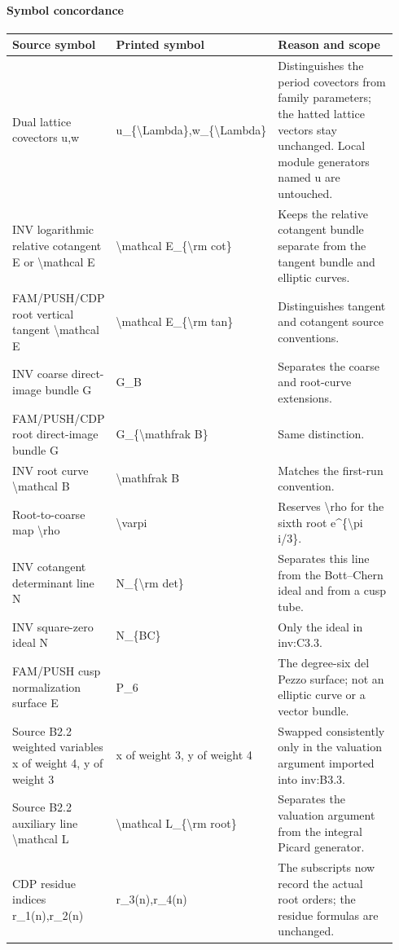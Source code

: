 \paragraph{Symbol concordance}
\begingroup\small\setlength{\tabcolsep}{3pt}\begin{longtable}{@{}L{0.24\linewidth}L{0.25\linewidth}L{0.45\linewidth}@{}}\toprule
Source symbol & Printed symbol & Reason and scope\\\midrule\endhead
Dual lattice covectors u,w & u\_\allowbreak{}\{\textbackslash{}Lambda\},w\_\allowbreak{}\{\textbackslash{}Lambda\} & Distinguishes the period covectors from family parameters; the hatted lattice vectors stay unchanged. Local module generators named u are untouched.\\
INV logarithmic relative cotangent E or \textbackslash{}mathcal E & \textbackslash{}mathcal E\_\allowbreak{}\{\textbackslash{}rm cot\} & Keeps the relative cotangent bundle separate from the tangent bundle and elliptic curves.\\
FAM/\allowbreak{}PUSH/\allowbreak{}CDP root vertical tangent \textbackslash{}mathcal E & \textbackslash{}mathcal E\_\allowbreak{}\{\textbackslash{}rm tan\} & Distinguishes tangent and cotangent source conventions.\\
INV coarse direct-image bundle G & G\_\allowbreak{}B & Separates the coarse and root-curve extensions.\\
FAM/\allowbreak{}PUSH/\allowbreak{}CDP root direct-image bundle G & G\_\allowbreak{}\{\textbackslash{}mathfrak B\} & Same distinction.\\
INV root curve \textbackslash{}mathcal B & \textbackslash{}mathfrak B & Matches the first-run convention.\\
Root-to-coarse map \textbackslash{}rho & \textbackslash{}varpi & Reserves \textbackslash{}rho for the sixth root e\textasciicircum{}\{\textbackslash{}pi i/\allowbreak{}3\}.\\
INV cotangent determinant line N & N\_\allowbreak{}\{\textbackslash{}rm det\} & Separates this line from the Bott--Chern ideal and from a cusp tube.\\
INV square-zero ideal N & N\_\allowbreak{}\{BC\} & Only the ideal in inv:\allowbreak{}C3.3.\\
FAM/\allowbreak{}PUSH cusp normalization surface E & P\_\allowbreak{}6 & The degree-six del Pezzo surface; not an elliptic curve or a vector bundle.\\
Source B2.2 weighted variables x of weight 4, y of weight 3 & x of weight 3, y of weight 4 & Swapped consistently only in the valuation argument imported into inv:\allowbreak{}B3.3.\\
Source B2.2 auxiliary line \textbackslash{}mathcal L & \textbackslash{}mathcal L\_\allowbreak{}\{\textbackslash{}rm root\} & Separates the valuation argument from the integral Picard generator.\\
CDP residue indices r\_\allowbreak{}1(n),r\_\allowbreak{}2(n) & r\_\allowbreak{}3(n),r\_\allowbreak{}4(n) & The subscripts now record the actual root orders; the residue formulas are unchanged.\\
\bottomrule\end{longtable}\endgroup
